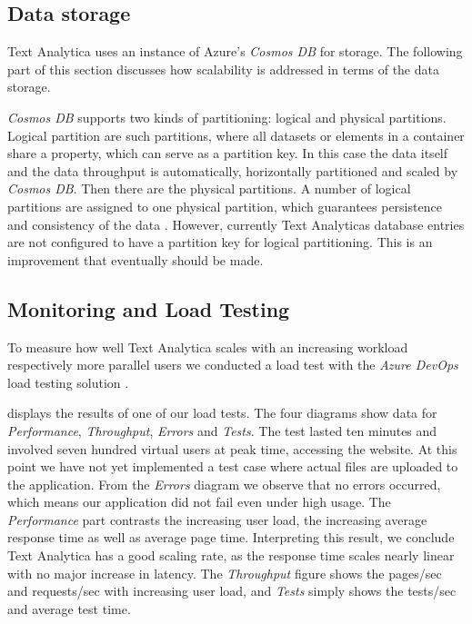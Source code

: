 \documentclass[conference]{IEEEtran}
\begin{document}
\subsection{Data storage}
Text Analytica uses an instance of Azure's \textit{Cosmos DB} for storage. The following part of this section discusses how scalability is addressed in terms of the data storage.

\textit{Cosmos DB} supports two kinds of partitioning: logical and physical partitions. Logical partition are such partitions, where all datasets or elements in a container share a property, which can serve as a partition key. In this case the data itself and the data throughput is automatically, horizontally partitioned and scaled by \textit{Cosmos DB}. Then there are the physical partitions. A number of logical partitions are assigned to one physical partition, which guarantees persistence and consistency of the data \cite{CosmosDBHorScal}. However, currently Text Analyticas database entries are not configured to have a partition key for logical partitioning. This is an improvement that eventually should be made.

\subsection{Monitoring and Load Testing}
To measure how well Text Analytica scales with an increasing workload respectively more parallel users we conducted a load test with the \textit{Azure DevOps} load testing solution \cite{AzureLoadTest}.

 displays the results of one of our load tests. The four diagrams show data for \textit{Performance}, \textit{Throughput}, \textit{Errors} and \textit{Tests}. The test lasted ten minutes and involved seven hundred virtual users at peak time, accessing the website. At this point we have not yet implemented a test case where actual files are uploaded to the application. From the \textit{Errors} diagram we observe that no errors occurred, which means our application did not fail even under high usage. The \textit{Performance} part contrasts the increasing user load, the increasing average response time as well as average page time. Interpreting this result, we conclude Text Analytica has a good scaling rate, as the response time scales nearly linear with no major increase in latency. The \textit{Throughput} figure shows the pages/sec and requests/sec with increasing user load, and \textit{Tests} simply shows the tests/sec and average test time.
\end{document}
